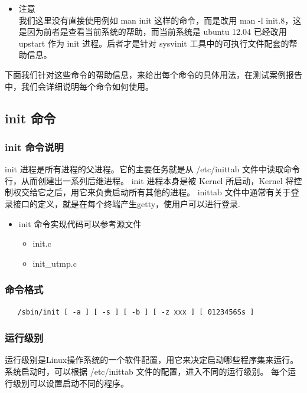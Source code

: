 \begin{itemize}
\item
  注意\\我们这里没有直接使用例如 man init 这样的命令，而是改用 man -l
  init.8，这是因为前者是查看当前系统的帮助，而当前系统是 ubuntu 12.04
  已经改用 upstart 作为 init 进程。后者才是针对 sysvinit
  工具中的可执行文件配套的帮助信息。
\end{itemize}
下面我们针对这些命令的帮助信息，来给出每个命令的具体用法，在测试案例报告中，我们会详细说明每个命令如何使用。

\subsection{init 命令}

\subsubsection{init 命令说明}

init 进程是所有进程的父进程。它的主要任务就是从 /etc/inittab
文件中读取命令行，从而创建出一系列后继进程。 init 进程本身是被 Kernel
所启动，Kernel 将控制权交给它之后，用它来负责启动所有其他的进程。 inittab
文件中通常有关于登录接口的定义，就是在每个终端产生getty，使用户可以进行登录.

\begin{itemize}
\item
  init 命令实现代码可以参考源文件
  \begin{itemize}
  \item
    init.c
  \item
    init\_utmp.c
  \end{itemize}
\end{itemize}
\subsubsection{命令格式}

{\begin{shaded}\begin{verbatim}
   /sbin/init [ -a ] [ -s ] [ -b ] [ -z xxx ] [ 0123456Ss ]
\end{verbatim}\end{shaded}}
\subsubsection{运行级别}

运行级别是Linux操作系统的一个软件配置，用它来决定启动哪些程序集来运行。
系统启动时，可以根据 /etc/inittab 文件的配置，进入不同的运行级别。
每个运行级别可以设置启动不同的程序。


